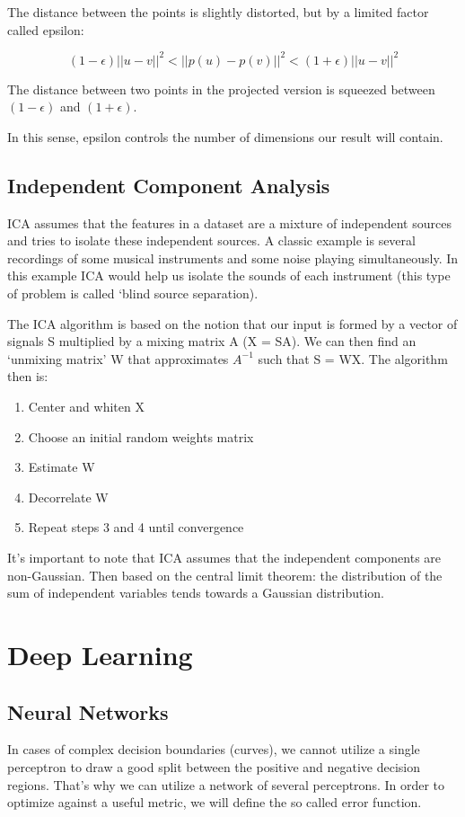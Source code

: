 \documentclass{article}
\begin{document}
The distance between the points is slightly distorted, but by a limited factor called epsilon:

\begin{equation}
  (1 - \epsilon) ||u - v||^2 < ||p(u) - p(v)||^2 < (1 + \epsilon) ||u - v||^2
\end{equation}

The distance between two points in the projected version is squeezed between $(1 - \epsilon)$ and $(1 + \epsilon)$.

In this sense, epsilon controls the number of dimensions our result will contain.

\subsection{Independent Component Analysis}
ICA assumes that the features in a dataset are a mixture of independent sources and tries to isolate these independent sources. A classic example is several recordings of some musical instruments and some noise playing simultaneously. In this example ICA would help us isolate the sounds of each instrument (this type of problem is called ‘blind source separation).

The ICA algorithm is based on the notion that our input is formed by a vector of signals S multiplied by a mixing matrix A (X = SA). We can then find an ‘unmixing matrix’ W that approximates $A^{-1}$ such that S = WX. The algorithm then is:

\begin{enumerate}
  \item Center and whiten X
  \item Choose an initial random weights matrix
  \item Estimate W
  \item Decorrelate W
  \item Repeat steps 3 and 4 until convergence
\end{enumerate}

It’s important to note that ICA assumes that the independent components are non-Gaussian. Then based on the central limit theorem: the distribution of the sum of independent variables tends towards a Gaussian distribution.

\section{Deep Learning}
\subsection{Neural Networks}
In cases of complex decision boundaries (curves), we cannot utilize a single perceptron to draw a good split between the positive and negative decision regions. That’s why we can utilize a network of several perceptrons. In order to optimize against a useful metric, we will define the so called error function.
\end{document}
